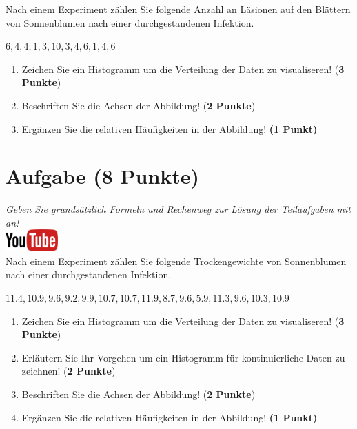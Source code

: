 \documentclass[a4paper, 10pt]{scrartcl}\usepackage[]{graphicx}\usepackage[]{xcolor}
\begin{document}
Nach einem Experiment z{\"a}hlen Sie folgende Anzahl an L{\"a}sionen auf den
Bl{\"a}ttern von Sonnenblumen nach einer durchgestandenen Infektion. 

\begin{center}
$6, 4, 4, 1, 3, 10, 3, 4, 6, 1, 4, 6$
\end{center}

\begin{enumerate}
\item Zeichen Sie ein Histogramm um die Verteilung der Daten zu visualiseren! (\textbf{3 Punkte})
\item Beschriften Sie die Achsen der Abbildung! (\textbf{2 Punkte})
\item Erg{\"a}nzen Sie die relativen H{\"a}ufigkeiten in der Abbildung! \textbf{(1
    Punkt)}  
\end{enumerate}

 
\clearpage

\section{Aufgabe \hfill (8 Punkte)}

\textit{Geben Sie grunds{\"a}tzlich Formeln und Rechenweg zur L{\"o}sung der
  Teilaufgaben mit an!} \\[1Ex]

\hfill\href{https://youtu.be/ORHSPTCdfeY}{\includegraphics[width =
  2cm]{img/youtube}}\\[1Ex]



Nach einem Experiment z{\"a}hlen Sie folgende Trockengewichte von Sonnenblumen nach einer durchgestandenen Infektion. 

\begin{center}
$11.4, 10.9, 9.6, 9.2, 9.9, 10.7, 10.7, 11.9, 8.7, 9.6, 5.9, 11.3, 9.6, 10.3, 10.9$
\end{center}

\begin{enumerate}
\item Zeichen Sie ein Histogramm um die Verteilung der Daten zu
  visualiseren! (\textbf{3 Punkte})
 \item Erl{\"a}utern Sie Ihr Vorgehen um ein Histogramm f{\"u}r kontinuierliche
  Daten zu zeichnen!  (\textbf{2 Punkte})
\item Beschriften Sie die Achsen der Abbildung! (\textbf{2 Punkte})
\item Erg{\"a}nzen Sie die relativen H{\"a}ufigkeiten in der Abbildung! \textbf{(1
    Punkt)}  
\end{enumerate}
\end{document}
